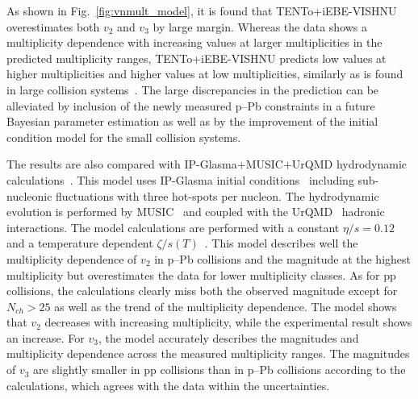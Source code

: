 As shown in Fig.~\ref{fig:vnmult_model}, it is found that {TENTo}+iEBE-VISHNU overestimates both $v_2$ and $v_3$ by large margin. Whereas the data shows a multiplicity dependence with increasing values at larger multiplicities in the predicted multiplicity ranges, {TENTo}+iEBE-VISHNU predicts low values at higher multiplicities and higher values at low multiplicities, similarly as is found in large collision systems~\cite{Acharya:2020taj}. The large discrepancies in the prediction can be alleviated by inclusion of the newly measured p--Pb constraints in a future Bayesian parameter estimation as well as by the improvement of the initial condition model for the small collision systems.

The results are also compared with IP-Glasma+MUSIC+UrQMD hydrodynamic calculations~\cite{Schenke:2020mbo}. This model uses IP-Glasma initial conditions~\cite{Schenke:2012wb} including sub-nucleonic fluctuations with three hot-spots per nucleon. The hydrodynamic evolution is performed by MUSIC~\cite{Schenke:2010rr} and coupled with the UrQMD~\cite{Bass:1998ca,Bleicher:1999xi} hadronic interactions. 
The model calculations are performed with a constant $\eta/s=0.12$ and a temperature dependent $\zeta/s(T)$~\cite{Rose:2020lfc}. 
This model describes well the multiplicity dependence of $v_2$ in p--Pb collisions and the magnitude at the highest multiplicity but overestimates the data for lower multiplicity classes. As for pp collisions, the calculations clearly miss both the observed magnitude except for $N_{ch}>25$ as well as the trend of the multiplicity dependence. The model shows that $v_2$ decreases with increasing multiplicity, while the experimental result shows an increase.
For $v_3$, the model accurately describes the magnitudes and multiplicity dependence across the measured multiplicity ranges. The magnitudes of $v_3$ are slightly smaller in pp collisions than in p--Pb collisions according to the calculations, which agrees with the data within the uncertainties.

